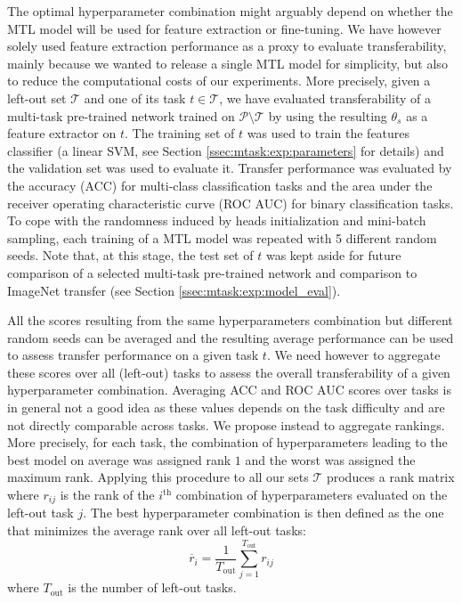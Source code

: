 The optimal hyperparameter combination might arguably depend on whether the MTL model will be used for feature extraction or fine-tuning. We have however solely used feature extraction performance as a proxy to evaluate transferability, mainly because we wanted to release a single MTL model for simplicity, but also to reduce the computational costs of our experiments. More precisely, given a left-out set $\mathcal{T}$ and one of its task $t \in \mathcal{T}$, we have evaluated transferability of a multi-task pre-trained network trained on $\mathcal{P} \setminus \mathcal{T}$ by using the resulting $\theta_s$ as a feature extractor on $t$. The training set of $t$ was used to train the features classifier (\ie a linear SVM, see Section \ref{ssec:mtask:exp:parameters} for details) and the validation set was used to evaluate it. Transfer performance was evaluated by the accuracy (ACC) for multi-class classification tasks and the area under the receiver operating characteristic curve (ROC AUC) for binary classification tasks. To cope with the randomness induced by heads initialization and mini-batch sampling, each training of a MTL model was repeated with 5 different random seeds. Note that, at this stage, the test set of $t$ was kept aside for future comparison of a selected multi-task pre-trained network and comparison to ImageNet transfer (see Section \ref{ssec:mtask:exp:model_eval}).

All the scores resulting from the same hyperparameters combination but different random seeds can be averaged and the resulting average performance can be used to assess transfer performance on a given task $t$. We need however to aggregate these scores over all (left-out) tasks to assess the overall transferability of a given hyperparameter combination. Averaging ACC and ROC AUC scores over tasks is in general not a good idea as these values depends on the task difficulty and are not directly comparable across tasks. We propose instead to aggregate rankings. More precisely, for each task, the combination of hyperparameters leading to the best model on average was assigned rank $1$ and the worst was assigned the maximum rank. Applying this procedure to all our sets $\mathcal{T}$ produces a rank matrix where $r_{ij}$ is the rank of the $i^{\text{th}}$ combination of hyperparameters evaluated on the left-out task $j$. The best hyperparameter combination is then defined as the one that minimizes the average rank over all left-out tasks:
\begin{equation} \label{eqn:average_ranks}
\overline{r}_i = \dfrac{1}{T_{\text{out}}} \sum^{T_{\text{out}}}_{j = 1} r_{ij}
\end{equation}
where $T_{\text{out}}$ is the number of left-out tasks.

